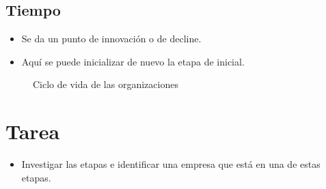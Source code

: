 \subsection{Tiempo}
\begin{itemize}
    \item Se da un punto de innovación o de decline.
    \item Aquí se puede inicializar de nuevo la etapa de inicial.
\end{itemize}



\begin{figure}[htbp]
    \centering
    \caption{Ciclo de vida de las organizaciones}
    \label{}
\end{figure} 


\section*{Tarea}
\begin{itemize}
    \item Investigar las etapas e identificar una empresa que está en una de estas etapas.
\end{itemize}
